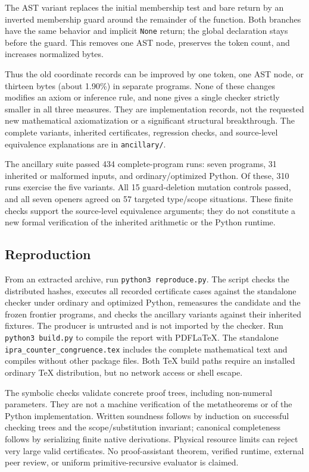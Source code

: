 \documentclass[11pt,letterpaper]{article}
\theoremstyle{definition}\newtheorem{definition}[theorem]{Definition}
\theoremstyle{remark}\newtheorem{remark}[theorem]{Remark}
\newcommand{\file}[1]{{\small\nolinkurl{#1}}}
\begin{document}
The AST variant replaces the initial membership test and bare return
by an inverted membership guard around the remainder of the function.
Both branches have the same behavior and implicit \texttt{None} return;
the global declaration stays before the guard. This removes one AST
node, preserves the token count, and increases normalized bytes.

Thus the old coordinate records can be improved by one token, one AST
node, or thirteen bytes (about 1.90\%) in separate programs. None of
these changes modifies an axiom or inference rule, and none gives a
single checker strictly smaller in all three measures. They are
implementation records, not the requested new mathematical
axiomatization or a significant structural breakthrough. The complete
variants, inherited certificates, regression checks, and source-level
equivalence explanations are in \file{ancillary/}.

The ancillary suite passed 434 complete-program runs: seven programs,
31 inherited or malformed inputs, and ordinary/optimized Python.
Of these, 310 runs exercise the five variants. All 15 guard-deletion
mutation controls passed, and all seven openers agreed on 57 targeted
type/scope situations. These finite checks support the source-level
equivalence arguments; they do not constitute a new formal verification
of the inherited arithmetic or the Python runtime.

\subsection{Reproduction}

From an extracted archive, run \file{python3 reproduce.py}. The script
checks the distributed hashes, executes all recorded certificate cases
against the standalone checker under ordinary and optimized Python,
remeasures the candidate and the frozen frontier programs, and checks
the ancillary variants against their inherited fixtures.
The producer is untrusted and is not imported by the checker. Run
\file{python3 build.py} to compile the report with PDFLaTeX.
The standalone \file{ipra_counter_congruence.tex} includes the complete
mathematical text and compiles without other package files. Both TeX
build paths require an installed ordinary TeX distribution, but no
network access or shell escape.

The symbolic checks validate concrete proof trees, including non-numeral
parameters. They are not a machine verification of the metatheorems or
of the Python implementation. Written soundness follows by induction
on successful checking trees and the scope/substitution invariant;
canonical completeness follows by serializing finite native derivations.
Physical resource limits can reject very large valid certificates.
No proof-assistant theorem, verified runtime, external peer review,
or uniform primitive-recursive evaluator is claimed.
\end{document}
